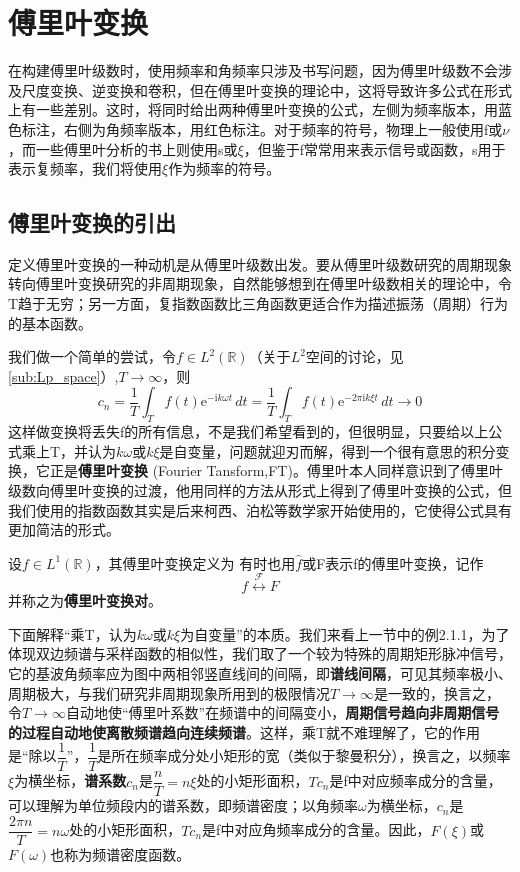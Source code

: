 \section{傅里叶变换}\label{sec:Fourier}

在构建傅里叶级数时，使用频率和角频率只涉及书写问题，因为傅里叶级数不会涉及尺度变换、逆变换和卷积，但在傅里叶变换的理论中，这将导致许多公式在形式上有一些差别。这时，将同时给出两种傅里叶变换的公式，左侧为频率版本，用蓝色标注，右侧为角频率版本，用红色标注。对于频率的符号，物理上一般使用f或$\nu $，而一些傅里叶分析的书上则使用s或$\xi$，但鉴于f常常用来表示信号或函数，s用于表示复频率，我们将使用$\xi$作为频率的符号。

\subsection{傅里叶变换的引出}\label{sub:introduction_of_fourier}
定义傅里叶变换的一种动机是从傅里叶级数出发。要从傅里叶级数研究的周期现象转向傅里叶变换研究的非周期现象，自然能够想到在傅里叶级数相关的理论中，令T趋于无穷；另一方面，复指数函数比三角函数更适合作为描述振荡（周期）行为的基本函数。

我们做一个简单的尝试，令$f\in L^2(\mathbb{R})$（关于$L^2$空间的讨论，见\ref{sub:Lp_space}）,$T\to \infty$，则\[c_n=\frac{1}{T}\int_{T}f(t)\mathrm{e}^{-\mathrm{i}k\omega t}\,dt=\frac{1}{T}\int_{T}f(t)\mathrm{e}^{-2\pi \mathrm{i}k\xi t}\,dt\to 0\]这样做变换将丢失f的所有信息，不是我们希望看到的，但很明显，只要给以上公式乘上T，并认为$k\omega$或$k\xi$是自变量，问题就迎刃而解，得到一个很有意思的积分变换，它正是\textbf{傅里叶变换} (Fourier Tansform,FT)。傅里叶本人同样意识到了傅里叶级数向傅里叶变换的过渡，他用同样的方法从形式上得到了傅里叶变换的公式，但我们使用的指数函数其实是后来柯西、泊松等数学家开始使用的，它使得公式具有更加简洁的形式。
\begin{definition}[傅里叶变换]
设$f\in L^1(\mathbb{R})$，其傅里叶变换定义为
有时也用$\hat{f}$或F表示f的傅里叶变换，记作
\[f\overset{\mathcal{F} }{\longleftrightarrow}F\]
并称之为\textbf{傅里叶变换对}。
\end{definition}

下面解释“乘T，认为$k\omega$或$k\xi$为自变量”的本质。我们来看上一节中的例2.1.1，为了体现双边频谱与采样函数的相似性，我们取了一个较为特殊的周期矩形脉冲信号，它的基波角频率应为图中两相邻竖直线间的间隔，即\textbf{谱线间隔}，可见其频率极小、周期极大，与我们研究非周期现象所用到的极限情况$T\to\infty$是一致的，换言之，令$T\to\infty$自动地使“傅里叶系数”在频谱中的间隔变小，\textbf{周期信号趋向非周期信号的过程自动地使离散频谱趋向连续频谱}。这样，乘T就不难理解了，它的作用是“除以$\dfrac{1}{T}$”，$\dfrac{1}{T}$是所在频率成分处小矩形的宽（类似于黎曼积分），换言之，以频率$\xi$为横坐标，\textbf{谱系数}$c_n$是$\dfrac{n}{T}=n\xi$处的小矩形面积，$Tc_n$是f中对应频率成分的含量，可以理解为单位频段内的谱系数，即频谱密度；以角频率$\omega$为横坐标，$c_n$是$\dfrac{2\pi n}{T}=n\omega$处的小矩形面积，$Tc_n$是f中对应角频率成分的含量。因此，$F(\xi)$或$F(\omega)$也称为频谱密度函数。

